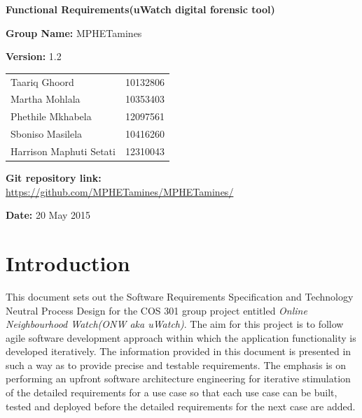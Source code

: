 \documentclass[a4paper,12pt]{article}
\begin{document}
\begin{center}

\Huge\textbf{Functional Requirements(uWatch digital forensic tool)\\}
																											
\vspace{2 cm}

\LARGE\textbf{Group Name:} MPHETamines\newline
 
 
\LARGE\textbf{Version:} 1.2\newline
 
 
 
\vspace{0.5 cm}
\begin{tabular}{lr}
Taariq Ghoord&10132806
\\ 
Martha Mohlala&10353403
\\
Phethile Mkhabela&12097561
\\
Sboniso Masilela&10416260
\\
Harrison Maphuti Setati&12310043\\
\end{tabular}

\vspace{1cm}
\textbf{Git repository link:\\}
\url{https://github.com/MPHETamines/MPHETamines/}

\vspace{1cm}
\textbf{Date:} 20 May 2015
\end{center}
\newpage

\tableofcontents







\newpage
{}

\section{Introduction}
This document sets out the Software Requirements Specification and Technology Neutral Process Design for the COS 301 group project entitled \textit{Online Neighbourhood Watch(ONW aka uWatch)}.
The aim for this project is to follow agile software development approach within which the application functionality is developed 
iteratively. 
The information provided in this document is presented in such a way as to provide precise and testable requirements. The emphasis is on performing an upfront software 
architecture engineering for iterative stimulation of the detailed requirements for a use case so that each use case can be built, tested and deployed before the detailed 
requirements for the next case are added.
\end{document}
